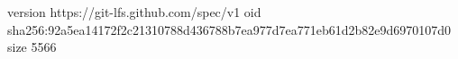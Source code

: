 version https://git-lfs.github.com/spec/v1
oid sha256:92a5ea14172f2c21310788d436788b7ea977d7ea771eb61d2b82e9d6970107d0
size 5566
